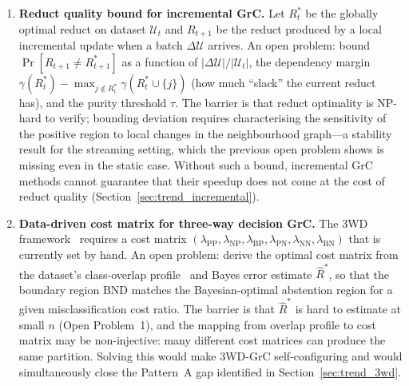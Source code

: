 \begin{enumerate}
\item \textbf{Reduct quality bound for incremental GrC.}
Let $R^*_t$ be the globally optimal reduct on dataset $\mathcal{U}_t$ and
$R_{t+1}$ be the reduct produced by a local incremental update when a batch
$\Delta\mathcal{U}$ arrives.  An open problem: bound
$\Pr[R_{t+1} \neq R^*_{t+1}]$ as a function of $|\Delta\mathcal{U}|/|\mathcal{U}_t|$,
the dependency margin $\gamma(R^*_t) - \max_{j \notin R^*_t}\gamma(R^*_t \cup \{j\})$
(how much ``slack'' the current reduct has), and the purity threshold $\tau$.
The barrier is that reduct optimality is NP-hard to verify; bounding deviation
requires characterising the sensitivity of the positive region to local changes
in the neighbourhood graph---a stability result for the streaming setting,
which the previous open problem shows is missing even in the static case.
Without such a
bound, incremental GrC methods cannot guarantee that their speedup does not
come at the cost of reduct quality (Section~\ref{sec:trend_incremental}).

\item \textbf{Data-driven cost matrix for three-way decision GrC.}
The 3WD framework~\cite{Yao2010threeway} requires a cost matrix
$(\lambda_{\mathrm{PP}}, \lambda_{\mathrm{NP}}, \lambda_{\mathrm{BP}},
\lambda_{\mathrm{PN}}, \lambda_{\mathrm{NN}}, \lambda_{\mathrm{BN}})$
that is currently set by hand.  An open problem: derive the optimal cost
matrix from the dataset's class-overlap profile~\cite{Santos2022overlap} and
Bayes error estimate $\hat{R}^*$, so that the boundary region $\mathrm{BND}$
matches the Bayesian-optimal abstention region for a given misclassification
cost ratio.  The barrier is that $\hat{R}^*$ is hard to estimate at small
$n$ (Open Problem~1), and the mapping from overlap profile to cost matrix
may be non-injective: many different cost matrices can produce the same
partition.  Solving this would make 3WD-GrC self-configuring and would
simultaneously close the Pattern~A gap identified in
Section~\ref{sec:trend_3wd}.


\end{enumerate}
